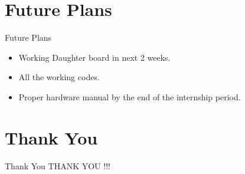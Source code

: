 \documentclass[10pt, a4paper]{beamer}
\begin{document}
\section{Future Plans}
\begin{frame}{Future Plans}
	\begin{itemize}
		\item Working Daughter board in next 2 weeks.
		\item All the  working codes.
		\item Proper hardware manual by the end of the internship period.   
	\end{itemize}
\end{frame}


\section{Thank You}
\begin{frame}{Thank You}
	\centering THANK YOU !!!
\end{frame}
\end{document}
